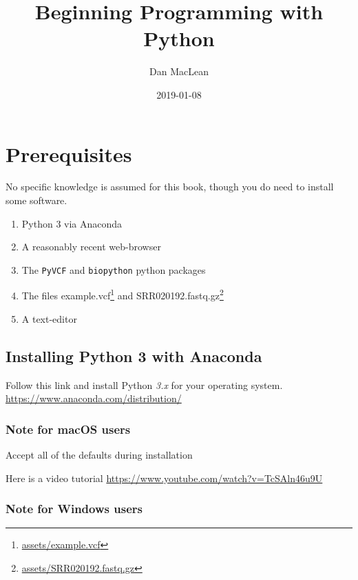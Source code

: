 \documentclass[]{book}
\title{Beginning Programming with Python}
\author{Dan MacLean}
\date{2019-01-08}
\providecommand{\tightlist}{%
  \setlength{\itemsep}{0pt}\setlength{\parskip}{0pt}}
\let\rmarkdownfootnote\footnote%
\def\footnote{\protect\rmarkdownfootnote}
\renewcommand{\href}[2]{#2\footnote{\url{#1}}}
\theoremstyle{definition}
\theoremstyle{definition}
\theoremstyle{definition}
\theoremstyle{remark}
\begin{document}
\maketitle

{
\setcounter{tocdepth}{1}
\tableofcontents
}
\hypertarget{prerequisites}{%
\chapter{Prerequisites}\label{prerequisites}}

No specific knowledge is assumed for this book, though you do need to
install some software.

\begin{enumerate}
\def\labelenumi{\arabic{enumi}.}
\tightlist
\item
  Python 3 via Anaconda
\item
  A reasonably recent web-browser
\item
  The \texttt{PyVCF} and \texttt{biopython} python packages
\item
  The files \href{assets/example.vcf}{example.vcf} and
  \href{assets/SRR020192.fastq.gz}{SRR020192.fastq.gz}
\item
  A text-editor
\end{enumerate}

\hypertarget{installing-python-3-with-anaconda}{%
\section{Installing Python 3 with
Anaconda}\label{installing-python-3-with-anaconda}}

Follow this link and install Python \emph{3.x} for your operating
system. \url{https://www.anaconda.com/distribution/}

\hypertarget{note-for-macos-users}{%
\subsection{Note for macOS users}\label{note-for-macos-users}}

Accept all of the defaults during installation

Here is a video tutorial
\url{https://www.youtube.com/watch?v=TcSAln46u9U}

\hypertarget{note-for-windows-users}{%
\subsection{Note for Windows users}\label{note-for-windows-users}}
\end{document}
